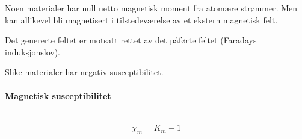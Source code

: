 Noen materialer har null netto magnetisk moment fra atomære strømmer.
Men kan allikevel bli magnetisert i tilstedeværelse av
et ekstern magnetisk felt.

Det genererte feltet er motsatt rettet av det påførte feltet
(Faradays induksjonslov).

Slike materialer har negativ susceptibilitet.



\paragraph{Magnetisk susceptibilitet} \hfill \\
$$\chi_m = K_m - 1$$
